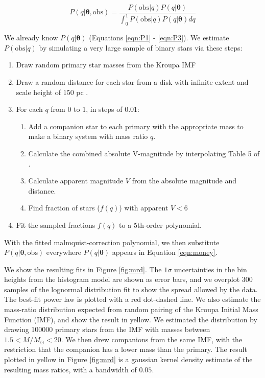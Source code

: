 \documentclass{emulateapj}
\renewcommand{\vec}[1]{\bm{#1}}
\begin{document}
\begin{equation}
P(q|\vec{\theta}, \mathrm{obs}) = \frac{P(\mathrm{obs}|q) P(q|\vec{\theta})}{\int_0^1 P(\mathrm{obs}|q) P(q|\vec{\theta}) dq}
\end{equation}

We already know $P(q|\vec{\theta})$ (Equations \ref{eqn:P1} - \ref{eqn:P3}). We estimate $P(\mathrm{obs}|q)$ by simulating a very large sample of binary stars via these steps:

\begin{enumerate}
\item Draw random primary star masses from the Kroupa IMF \citep{Kroupa2002}
\item Draw a random distance for each star from a disk with infinite extent and scale height of $150$ pc \citep[the approximate scale height of the Milky Way disk for A-type stars,][]{BM1998}. 
\item For each $q$ from 0 to 1, in steps of 0.01:
\begin{enumerate}
  \item Add a companion star to each primary with the appropriate mass to make a binary system with mass ratio $q$.
  \item Calculate the combined absolute V-magnitude by interpolating Table 5 of \citet{Pecaut2013}.
  \item Calculate apparent magnitude $V$ from the absolute magnitude and distance.
  \item Find fraction of stars ($f(q)$) with apparent $V < 6$
\end{enumerate}
\item Fit the sampled fractions $f(q)$ to a 5th-order polynomial.
\end{enumerate}

With the fitted malmquist-correction polynomial, we then substitute $P(q|\vec{\theta}, \mathrm{obs})$ everywhere $P(q|\vec{\theta})$ appears in Equation \ref{eqn:money}.

We show the resulting fits in Figure \ref{fig:mrd}. The $1\sigma$ uncertainties in the bin heights from the histogram model are shown as error bars, and we overplot 300 samples of the lognormal distribution fit to show the spread allowed by the data. The best-fit power law is plotted with a red dot-dashed line. We also estimate the mass-ratio distribution expected from random pairing of the Kroupa Initial Mass Function (IMF), and show the result in yellow. We estimated the distribution by drawing 100000 primary stars from the IMF with masses between $1.5 < M/M_{\odot} < 20$. We then drew companions from the same IMF, with the restriction that the companion has a lower mass than the primary. The result plotted in yellow in Figure \ref{fig:mrd} is a gaussian kernel density estimate of the resulting mass ratios, with a bandwidth of $0.05$.
\end{document}
